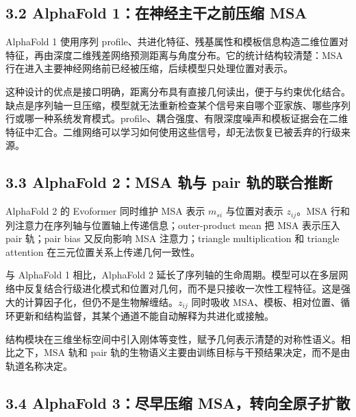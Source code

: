 \documentclass[10pt]{article}
\begin{document}
\subsection*{3.2 AlphaFold 1：在神经主干之前压缩 MSA}


AlphaFold 1 使用序列 profile、共进化特征、残基属性和模板信息构造二维位置对特征，再由深度二维残差网络预测距离与角度分布。它的统计结构较清楚：MSA 行在进入主要神经网络前已经被压缩，后续模型只处理位置对表示。\par

这种设计的优点是接口明确，距离分布具有直接几何读出，便于与约束优化结合。缺点是序列轴一旦压缩，模型就无法重新检查某个信号来自哪个亚家族、哪些序列行或哪一种系统发育模式。profile、耦合强度、有限深度噪声和模板证据会在二维特征中汇合。二维网络可以学习如何使用这些信号，却无法恢复已被丢弃的行级来源。\par

\subsection*{3.3 AlphaFold 2：MSA 轨与 pair 轨的联合推断}


AlphaFold 2 的 Evoformer 同时维护 MSA 表示 \(m_{si}\) 与位置对表示 \(z_{ij}\)。MSA 行和列注意力在序列轴与位置轴上传递信息；outer-product mean 把 MSA 表示压入 pair 轨；pair bias 又反向影响 MSA 注意力；triangle multiplication 和 triangle attention 在三元位置关系上传递几何一致性。\par

与 AlphaFold 1 相比，AlphaFold 2 延长了序列轴的生命周期。模型可以在多层网络中反复结合行级进化模式和位置对几何，而不是只接收一次性工程特征。这是强大的计算因子化，但仍不是生物解缠结。\(z_{ij}\) 同时吸收 MSA、模板、相对位置、循环更新和结构监督，其某个通道不能自动解释为共进化或接触。\par

结构模块在三维坐标空间中引入刚体等变性，赋予几何表示清楚的对称性语义。相比之下，MSA 轨和 pair 轨的生物语义主要由训练目标与干预结果决定，而不是由轨道名称决定。\par

\subsection*{3.4 AlphaFold 3：尽早压缩 MSA，转向全原子扩散}
\end{document}
